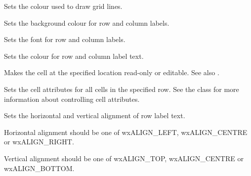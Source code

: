 Sets the colour used to draw grid lines.

\label{wxgridsetlabelbackgroundcolour}


Sets the background colour for row and column labels.

\label{wxgridsetlabelfont}


Sets the font for row and column labels.

\label{wxgridsetlabeltextcolour}


Sets the colour for row and column label text.

\label{wxgridsetreadonly}


Makes the cell at the specified location read-only or editable.
See also .

\label{wxgridsetrowattr}


Sets the cell attributes for all cells in the specified row.
See the  class for more information
about controlling cell attributes.

\label{wxgridsetrowlabelalignment}


Sets the horizontal and vertical alignment of row label text.

Horizontal alignment should be one of wxALIGN\_LEFT, wxALIGN\_CENTRE or wxALIGN\_RIGHT.

Vertical alignment should be one of wxALIGN\_TOP, wxALIGN\_CENTRE or wxALIGN\_BOTTOM.

\label{wxgridsetrowlabelsize}


